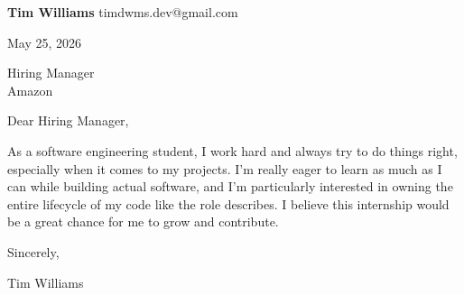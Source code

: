\documentclass[12pt]{article}
\begin{document}
\textbf{Tim Williams} \hfill timdwms.dev@gmail.com

\vspace{1em}

May 25, 2026

\vspace{1em}

Hiring Manager \\
Amazon

\vspace{1em}

Dear Hiring Manager,

As a software engineering student, I work hard and always try to do things right, especially when it comes to my projects. I'm really eager to learn as much as I can while building actual software, and I'm particularly interested in owning the entire lifecycle of my code like the role describes. I believe this internship would be a great chance for me to grow and contribute.

\vspace{1em}

Sincerely,

\vspace{2em}

Tim Williams
\end{document}
